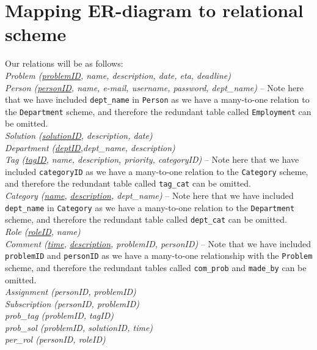 \section{Mapping ER-diagram to relational scheme}
\label{sec:map_er_rel}

Our relations will be as follows:\\

\noindent\textit{Problem (\underline{problemID}, name, description, date, eta, deadline)} \\

\noindent\textit{Person (\underline{personID}, name, e-mail, username, password, dept\_name)}  -- Note here that we have included \verb+dept_name+ in \verb+Person+ as we have a many-to-one relation to the \verb+Department+ scheme, and therefore the redundant table called \verb+Employment+ can be omitted.\\

\noindent\textit{Solution (\underline{solutionID}, description, date)} \\

\noindent\textit{Department (\underline{deptID},dept\_name, description)} \\

\noindent\textit{Tag (\underline{tagID}, name, description, priority, categoryID)} -- Note here that we have included \verb+categoryID+ as we have a many-to-one relation to the \verb+Category+ scheme, and therefore the redundant table called \verb+tag_cat+ can be omitted.\\

\noindent\textit{Category (\underline{name}, \underline{description}, dept\_name)} -- Note here that we have included \verb+dept_name+ in \verb+Category+ as we have a many-to-one relation to the \verb+Department+ scheme, and therefore the redundant table called \verb+dept_cat+ can be omitted.\\

\noindent\textit{Role (\underline{roleID}, name)} \\

\noindent\textit{Comment (\underline{time}, \underline{description}, problemID, personID)} -- Note that we have included \verb+problemID+ and \verb+personID+ as we have a many-to-one relationship with the \verb+Problem+ scheme, and therefore the redundant tables called \verb+com_prob+ and \verb+made_by+ can be omitted.\\

\noindent\textit{Assignment (personID, problemID)} \\

\noindent\textit{Subscription (personID, problemID)} \\

\noindent\textit{prob\_tag (problemID, tagID)} \\

\noindent\textit{prob\_sol (problemID, solutionID, time)} \\

\noindent\textit{per\_rol (personID, roleID)} \\